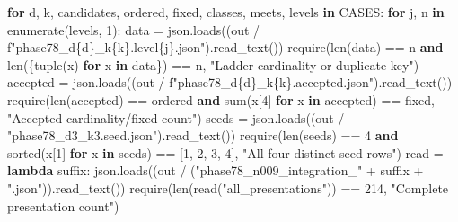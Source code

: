 \documentclass[
  10pt,
  letterpaper,
]{article}
\newenvironment{Shaded}{}{}
\newcommand{\BuiltInTok}[1]{\textcolor[rgb]{0.00,0.50,0.00}{#1}}
\newcommand{\ControlFlowTok}[1]{\textcolor[rgb]{0.00,0.44,0.13}{\textbf{#1}}}
\newcommand{\DecValTok}[1]{\textcolor[rgb]{0.25,0.63,0.44}{#1}}
\newcommand{\KeywordTok}[1]{\textcolor[rgb]{0.00,0.44,0.13}{\textbf{#1}}}
\newcommand{\NormalTok}[1]{#1}
\newcommand{\OperatorTok}[1]{\textcolor[rgb]{0.40,0.40,0.40}{#1}}
\newcommand{\SpecialCharTok}[1]{\textcolor[rgb]{0.25,0.44,0.63}{#1}}
\newcommand{\SpecialStringTok}[1]{\textcolor[rgb]{0.73,0.40,0.53}{#1}}
\newcommand{\StringTok}[1]{\textcolor[rgb]{0.25,0.44,0.63}{#1}}
\begin{document}
\begin{Shaded}
\begin{Highlighting}[]
    \ControlFlowTok{for}\NormalTok{ d, k, candidates, ordered, fixed, classes, meets, levels }\KeywordTok{in}\NormalTok{ CASES:}
        \ControlFlowTok{for}\NormalTok{ j, n }\KeywordTok{in} \BuiltInTok{enumerate}\NormalTok{(levels, }\DecValTok{1}\NormalTok{):}
\NormalTok{            data }\OperatorTok{=}\NormalTok{ json.loads((out }\OperatorTok{/} \SpecialStringTok{f"phase78\_d}\SpecialCharTok{\{}\NormalTok{d}\SpecialCharTok{\}}\SpecialStringTok{\_k}\SpecialCharTok{\{}\NormalTok{k}\SpecialCharTok{\}}\SpecialStringTok{.level}\SpecialCharTok{\{}\NormalTok{j}\SpecialCharTok{\}}\SpecialStringTok{.json"}\NormalTok{).read\_text())}
\NormalTok{            require(}\BuiltInTok{len}\NormalTok{(data) }\OperatorTok{==}\NormalTok{ n }\KeywordTok{and} \BuiltInTok{len}\NormalTok{(\{}\BuiltInTok{tuple}\NormalTok{(x) }\ControlFlowTok{for}\NormalTok{ x }\KeywordTok{in}\NormalTok{ data\}) }\OperatorTok{==}\NormalTok{ n, }\StringTok{"Ladder cardinality or duplicate key"}\NormalTok{)}
\NormalTok{        accepted }\OperatorTok{=}\NormalTok{ json.loads((out }\OperatorTok{/} \SpecialStringTok{f"phase78\_d}\SpecialCharTok{\{}\NormalTok{d}\SpecialCharTok{\}}\SpecialStringTok{\_k}\SpecialCharTok{\{}\NormalTok{k}\SpecialCharTok{\}}\SpecialStringTok{.accepted.json"}\NormalTok{).read\_text())}
\NormalTok{        require(}\BuiltInTok{len}\NormalTok{(accepted) }\OperatorTok{==}\NormalTok{ ordered }\KeywordTok{and} \BuiltInTok{sum}\NormalTok{(x[}\DecValTok{4}\NormalTok{] }\ControlFlowTok{for}\NormalTok{ x }\KeywordTok{in}\NormalTok{ accepted) }\OperatorTok{==}\NormalTok{ fixed, }\StringTok{"Accepted cardinality/fixed count"}\NormalTok{)}
\NormalTok{    seeds }\OperatorTok{=}\NormalTok{ json.loads((out }\OperatorTok{/} \StringTok{"phase78\_d3\_k3.seed.json"}\NormalTok{).read\_text())}
\NormalTok{    require(}\BuiltInTok{len}\NormalTok{(seeds) }\OperatorTok{==} \DecValTok{4} \KeywordTok{and} \BuiltInTok{sorted}\NormalTok{(x[}\DecValTok{1}\NormalTok{] }\ControlFlowTok{for}\NormalTok{ x }\KeywordTok{in}\NormalTok{ seeds) }\OperatorTok{==}\NormalTok{ [}\DecValTok{1}\NormalTok{, }\DecValTok{2}\NormalTok{, }\DecValTok{3}\NormalTok{, }\DecValTok{4}\NormalTok{], }\StringTok{"All four distinct seed rows"}\NormalTok{)}
\NormalTok{    read }\OperatorTok{=} \KeywordTok{lambda}\NormalTok{ suffix: json.loads((out }\OperatorTok{/}\NormalTok{ (}\StringTok{"phase78\_n009\_integration\_"} \OperatorTok{+}\NormalTok{ suffix }\OperatorTok{+} \StringTok{".json"}\NormalTok{)).read\_text())}
\NormalTok{    require(}\BuiltInTok{len}\NormalTok{(read(}\StringTok{"all\_presentations"}\NormalTok{)) }\OperatorTok{==} \DecValTok{214}\NormalTok{, }\StringTok{"Complete presentation count"}\NormalTok{)}

\end{Highlighting}
\end{Shaded}
\end{document}
